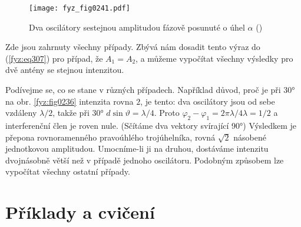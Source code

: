     \begin{figure}[ht!] %
      \centering
      \texttt{[image: fyz\_fig0241.pdf]}
      \caption{ Dva oscilátory sestejnou amplitudou fázově posunuté o úhel \(\alpha\)
               (\cite[s.~389]{Feynman01})}
      \label{fyz:fig0241}
    \end{figure}
    
    Zde jsou zahrnuty všechny případy. Zbývá nám dosadit tento výraz do (\ref{fyz:eq307}) pro 
    případ, že \(A_1 = A_2\), a můžeme vypočítat všechny výsledky pro dvě antény se stejnou 
    intenzitou.
    
    Podívejme se, co se stane v různých případech. Například důvod, proč je při \ang{30} na obr. 
    \ref{fyz:fig0236} intenzita rovna \(2\), je tento: dva oscilátory jsou od sebe vzdáleny 
    \(\lambda/2\), takže při \ang{30} \(d\sin\vartheta= \lambda/4\). Proto \(\varphi_2 - \varphi_1 
    = 2\pi\lambda/4\lambda = 1/2\) a interferenční člen je roven nule. (Sčítáme dva vektory 
    svírající \ang{90;;}) Výsledkem je přepona rovnoramenného pravoúhlého trojúhelníka, rovná 
    \(\sqrt{2}\) násobené jednotkovou amplitudou. Umocníme-li ji na druhou, dostáváme intenzitu 
    dvojnásobně větší než v případě jednoho oscilátoru. Podobným způsobem lze vypočítat všechny 
    ostatní případy.
    
  \section{Příklady a cvičení}\label{fyz:IchapXXIXsecVI}

